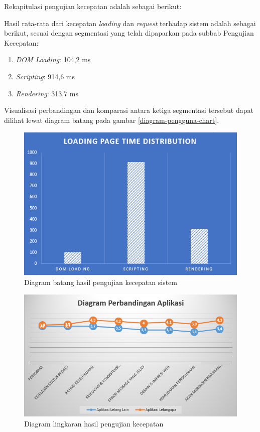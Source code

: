 Rekapitulasi pengujian kecepatan adalah sebagai berikut:

Hasil rata-rata dari kecepatan \textit{loading} dan \textit{request} terhadap sistem adalah sebagai berikut, sesuai dengan segmentasi yang telah dipaparkan pada subbab Pengujian Kecepatan:
\begin{enumerate}
	\item \textit{DOM Loading}: 104,2 ms
	\item \textit{Scripting}: 914,6 ms
	\item \textit{Rendering}: 313,7 ms
\end{enumerate}

Visualisasi perbandingan dan komparasi antara ketiga segmentasi tersebut dapat dilihat lewat diagram batang pada gambar \ref{diagram-pengguna-chart}.

\begin{figure}[H]
	\centering
	\includegraphics[width=\textwidth]{images/bab5/speed/bar-chart.png}
	\caption{Diagram batang hasil pengujian kecepatan sistem }
	\label{chart-speed-test}
\end{figure}

\begin{figure}[H]
	\centering
	\includegraphics[width=\textwidth]{images/bab5/ujipengguna/chart.png}
	\caption{Diagram lingkaran hasil pengujian kecepatan}
	\label{circle-chart-speed-test}
\end{figure}

